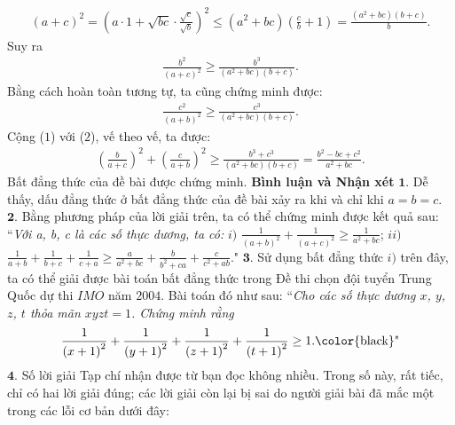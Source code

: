 \begin{multicols}{2}
	\begin{align*}
		{\left( {a + c} \right)^2} = {\left( {a \cdot 1 + \sqrt {bc}  \cdot \frac{{\sqrt c }}{{\sqrt b }}} \right)^2} \le \left( {{a^2} + bc} \right)\left( {\frac{c}{b} + 1} \right) = \frac{{\left( {{a^2} + bc} \right)\left( {b + c} \right)}}{b}.
	\end{align*}
	Suy ra
	\begin{align*}
		\frac{{{b^2}}}{{{{\left( {a + c} \right)}^2}}} \ge \frac{{{b^3}}}{{\left( {{a^2} + bc} \right)\left( {b + c} \right)}}. \tag{$1$}
	\end{align*}
	Bằng cách hoàn toàn tương tự, ta cũng chứng minh được:
	\begin{align*}
		\frac{{{c^2}}}{{{{\left( {a + b} \right)}^2}}} \ge \frac{{{c^3}}}{{\left( {{a^2} + bc} \right)\left( {b + c} \right)}}. \tag{$2$}
	\end{align*}
	Cộng ($1$) với ($2$), vế theo vế, ta được:
	\begin{align*}
		{\left( {\frac{b}{{a + c}}} \right)^2} + {\left( {\frac{c}{{a + b}}} \right)^2} \ge \frac{{{b^3} + {c^3}}}{{\left( {{a^2} + bc} \right)\left( {b + c} \right)}} = \frac{{{b^2} - bc + {c^2}}}{{{a^2} + bc}}.
	\end{align*}
	Bất đẳng thức của đề bài được chứng minh.
	\vskip 0.05cm
	\textbf{Bình luận và Nhận xét}
	\vskip 0.05cm
	$\pmb{1.}$ Dễ thấy, dấu đẳng thức ở bất đẳng thức của đề bài xảy ra khi và chỉ khi $a = b = c$.
	\vskip 0.05cm
	$\pmb{2.}$ Bằng phương pháp của lời giải trên, ta có thể chứng minh được kết quả sau:
	\vskip 0.05cm
	``\textit{Với a, b, c là các số thực dương, ta có:}
	\vskip 0.05cm
	$i)$  $\frac{1}{{{{\left( {a + b} \right)}^2}}} + \frac{1}{{{{\left( {a + c} \right)}^2}}} \ge \frac{1}{{{a^2} + bc}}$;
	\vskip 0.05cm
	$ii)$  $\frac{1}{{a + b}} + \frac{1}{{b + c}} + \frac{1}{{c + a}} \ge \frac{a}{{{a^2} + bc}} + \frac{b}{{{b^2} + ca}} + \frac{c}{{{c^2} + ab}}.$"
	\vskip 0.05cm
	$\pmb{3.}$ Sử dụng bất đẳng thức $i)$ trên đây, ta có thể giải được bài toán bất đẳng thức trong Đề thi chọn đội tuyển Trung Quốc dự thi $IMO$ năm $2004$. Bài toán đó như sau:
	\vskip 0.05cm
	``\textit{Cho các số thực dương $x$, $y$, $z$, $t$ thỏa mãn $xyzt = 1$. Chứng minh rằng}
	\begin{align*}
		\frac{1}{{{{\left( {x + 1} \right)}^2}}} + \frac{1}{{{{\left( {y + 1} \right)}^2}}} + \frac{1}{{{{\left( {z + 1} \right)}^2}}} + \frac{1}{{{{\left( {t + 1} \right)}^2}}} \ge 1. \text{\color{black}"}
	\end{align*}
	$\pmb{4.}$ Số lời giải Tạp chí nhận được từ bạn đọc không nhiều. Trong số này, rất tiếc, chỉ có hai lời giải đúng; các lời giải còn lại bị sai do người giải bài đã mắc một trong các lỗi cơ bản dưới đây:

\end{multicols}
